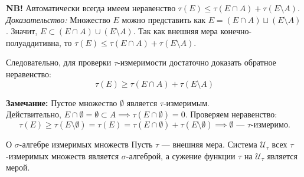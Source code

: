 \documentclass[12pt,a4paper]{article}
\begin{document}
\noindent \textbf{NB!} Автоматически всегда имеем неравенство $\tau(E) \le \tau(E \cap A) + \tau(E \setminus A)$. \\
\textit{Доказательство:} Множество $E$ можно представить как $E = (E \cap A) \sqcup (E \setminus A)$. Значит, $E \subset (E \cap A) \cup (E \setminus A)$. Так как внешняя мера конечно-полуаддитивна, то $\tau(E) \le \tau(E \cap A) + \tau(E \setminus A)$.

Следовательно, для проверки $\tau$-измеримости достаточно доказать обратное неравенство: 
$$ \tau(E) \ge \tau(E \cap A) + \tau(E \setminus A) $$

\noindent \textbf{Замечание:} Пустое множество $\emptyset$ является $\tau$-измеримым. \\
Действительно, $E \cap \emptyset = \emptyset \subset A \implies \tau(E \cap \emptyset) = 0$. Проверяем неравенство:
$$ \tau(E) \ge \tau(E \setminus \emptyset) = \tau(E) = \tau(E \cap \emptyset) + \tau(E \setminus \emptyset) \implies \emptyset \text{ — } \tau\text{-измеримо.} $$

\begin{Theorem}{О $\sigma$-алгебре измеримых множеств}{}
Пусть $\tau$ — внешняя мера. Система $\mathcal{U}_\tau$ всех $\tau$-измеримых множеств является $\sigma$-алгеброй, а сужение функции $\tau$ на $\mathcal{U}_\tau$ является мерой.
\end{Theorem}
\end{document}

